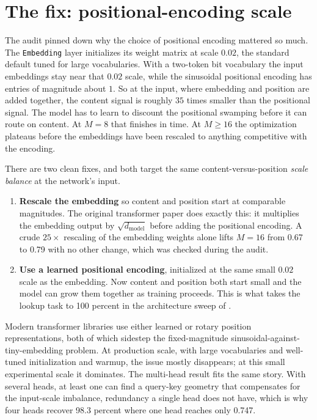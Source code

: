 
\section{The fix: positional-encoding scale}\label{sec:pe-scale-fix}

The audit pinned down why the choice of positional encoding mattered so much.
The \texttt{Embedding} layer initializes its weight matrix at scale $0.02$,
the standard default tuned for large vocabularies. With a two-token bit
vocabulary the input embeddings stay near that $0.02$ scale, while the
sinusoidal positional encoding has entries of magnitude about $1$. So at the
input, where embedding and position are added together, the content signal is
roughly $35$ times smaller than the positional signal. The model has to learn
to discount the positional swamping before it can route on content. At $M=8$
that finishes in time. At $M \geq 16$ the optimization plateaus before the
embeddings have been rescaled to anything competitive with the encoding.

There are two clean fixes, and both target the same content-versus-position
\emph{scale balance} at the network's input.

\begin{enumerate}
\item \textbf{Rescale the embedding} so content and position start at
comparable magnitudes. The original transformer paper does exactly this: it
multiplies the embedding output by $\sqrt{d_{\text{model}}}$ before adding the
positional encoding. A crude $25\times$ rescaling of the embedding weights
alone lifts $M=16$ from 0.67 to 0.79 with no other change, which was checked
during the audit.
\item \textbf{Use a learned positional encoding}, initialized at the same
small $0.02$ scale as the embedding. Now content and position both start small
and the model can grow them together as training proceeds. This is what takes
the lookup task to 100 percent in the architecture sweep of
.
\end{enumerate}

Modern transformer libraries use either learned or rotary position
representations, both of which sidestep the fixed-magnitude
sinusoidal-against-tiny-embedding problem. At production scale, with large
vocabularies and well-tuned initialization and warmup, the issue mostly
disappears; at this small experimental scale it dominates. The multi-head
result fits the same story. With several heads, at least one can find a
query-key geometry that compensates for the input-scale imbalance, redundancy
a single head does not have, which is why four heads recover 98.3 percent
where one head reaches only 0.747.

